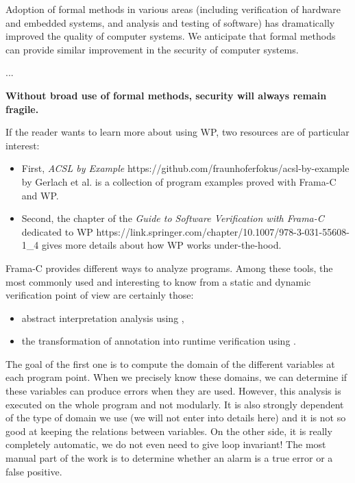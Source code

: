 \begin{Quotation}
Adoption of formal methods in various areas (including verification of hardware
and embedded systems, and analysis and testing of software) has dramatically
improved the quality of computer systems.  We anticipate that formal methods
can provide similar improvement in the security of computer systems.

...

\textbf{Without broad use of formal methods, security will always remain fragile.}
\end{Quotation}







If the reader wants to learn more about using WP, two resources are of particular
interest:
\begin{itemize}
  \item First,
        \externalLink
          {\textit{ACSL by Example}}
          {https://github.com/fraunhoferfokus/acsl-by-example}
        by Gerlach et al. is a collection of program examples proved with
        Frama-C and WP.
  \item Second, the
        \externalLink
          {chapter of the \textit{Guide to Software Verification with Frama-C} dedicated to WP}
          {https://link.springer.com/chapter/10.1007/978-3-031-55608-1_4}
        gives more details about how WP works under-the-hood.
\end{itemize}




Frama-C provides different ways to analyze programs. Among these tools, the
most commonly used and interesting to know from a static and dynamic
verification point of view are certainly those:
\begin{itemize}
\item abstract interpretation analysis using
,
\item the transformation of annotation into runtime verification using
.
\end{itemize}

The goal of the first one is to compute the domain of the different
variables at each program point. When we precisely know these domains,
we can determine if these variables can produce errors when they are
used. However, this analysis is executed on the whole program and not
modularly. It is also strongly dependent of the type of domain we use (we
will not enter into details here) and it is not so good at keeping the
relations between variables. On the other side, it is really completely
automatic, we do not even need to give loop invariant! The most manual
part of the work is to determine whether an alarm is a true error
or a false positive.

